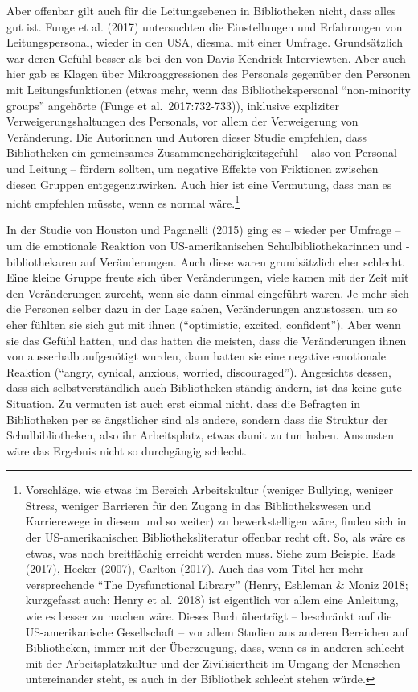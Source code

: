 \documentclass[a4paper,
fontsize=11pt,
oneside,
numbers=noperiodatend,
parskip=half-,
bibliography=totoc,
final
]{scrartcl}
\begin{document}
Aber offenbar gilt auch für die Leitungsebenen in Bibliotheken nicht,
dass alles gut ist. Funge et al. (2017) untersuchten die Einstellungen
und Erfahrungen von Leitungspersonal, wieder in den USA, diesmal mit
einer Umfrage. Grundsätzlich war deren Gefühl besser als bei den von
Davis Kendrick Interviewten. Aber auch hier gab es Klagen über
Mikroaggressionen des Personals gegenüber den Personen mit
Leitungsfunktionen (etwas mehr, wenn das Bibliothekspersonal
\enquote{non-minority groups} angehörte (Funge et al.~2017:732-733)),
inklusive expliziter Verweigerungshaltungen des Personals, vor allem der
Verweigerung von Veränderung. Die Autorinnen und Autoren dieser Studie
empfehlen, dass Bibliotheken ein gemeinsames Zusammengehörigkeitsgefühl
-- also von Personal und Leitung -- fördern sollten, um negative Effekte
von Friktionen zwischen diesen Gruppen entgegenzuwirken. Auch hier ist
eine Vermutung, dass man es nicht empfehlen müsste, wenn es normal
wäre.\footnote{Vorschläge, wie etwas im Bereich Arbeitskultur (weniger
  Bullying, weniger Stress, weniger Barrieren für den Zugang in das
  Bibliothekswesen und Karrierewege in diesem und so weiter) zu
  bewerkstelligen wäre, finden sich in der US-amerikanischen
  Bibliotheksliteratur offenbar recht oft. So, als wäre es etwas, was
  noch breitflächig erreicht werden muss. Siehe zum Beispiel Eads
  (2017), Hecker (2007), Carlton (2017). Auch das vom Titel her mehr
  versprechende \enquote{The Dysfunctional Library} (Henry, Eshleman \&
  Moniz 2018; kurzgefasst auch: Henry et al.~2018) ist eigentlich vor
  allem eine Anleitung, wie es besser zu machen wäre. Dieses Buch
  überträgt -- beschränkt auf die US-amerikanische Gesellschaft -- vor
  allem Studien aus anderen Bereichen auf Bibliotheken, immer mit der
  Überzeugung, dass, wenn es in anderen schlecht mit der
  Arbeitsplatzkultur und der Zivilisiertheit im Umgang der Menschen
  untereinander steht, es auch in der Bibliothek schlecht stehen würde.}

In der Studie von Houston und Paganelli (2015) ging es -- wieder per
Umfrage -- um die emotionale Reaktion von US-amerikanischen
Schulbibliothekarinnen und -bibliothekaren auf Veränderungen. Auch diese
waren grundsätzlich eher schlecht. Eine kleine Gruppe freute sich über
Veränderungen, viele kamen mit der Zeit mit den Veränderungen zurecht,
wenn sie dann einmal eingeführt waren. Je mehr sich die Personen selber
dazu in der Lage sahen, Veränderungen anzustossen, um so eher fühlten
sie sich gut mit ihnen (\enquote{optimistic, excited, confident}). Aber
wenn sie das Gefühl hatten, und das hatten die meisten, dass die
Veränderungen ihnen von ausserhalb aufgenötigt wurden, dann hatten sie
eine negative emotionale Reaktion (\enquote{angry, cynical, anxious,
worried, discouraged}). Angesichts dessen, dass sich selbstverständlich
auch Bibliotheken ständig ändern, ist das keine gute Situation. Zu
vermuten ist auch erst einmal nicht, dass die Befragten in Bibliotheken
per se ängstlicher sind als andere, sondern dass die Struktur der
Schulbibliotheken, also ihr Arbeitsplatz, etwas damit zu tun haben.
Ansonsten wäre das Ergebnis nicht so durchgängig schlecht.
\end{document}
